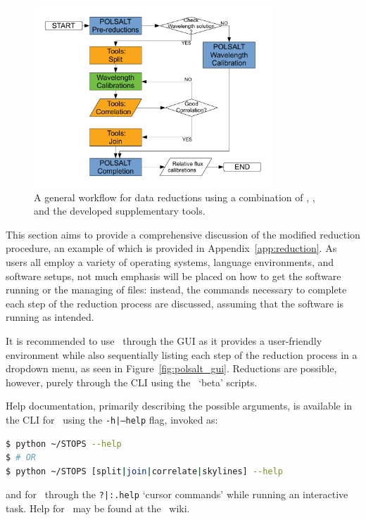 \begin{figure}[t]
    \centering
    \includegraphics[width = 0.8\textwidth]{figures/3_new_workflow.pdf}
    \caption{A general workflow for data reductions using a combination of \polsalt, \iraf, and the developed supplementary tools.}
    \label{fig:new_workflow}
\end{figure}

This section aims to provide a comprehensive discussion of the modified reduction procedure, an example of which is provided in Appendix~\ref{app:reduction}. As users all employ a variety of operating systems, language environments, and software setups, not much emphasis will be placed on how to get the software running or the managing of files: instead, the commands necessary to complete each step of the reduction process are discussed, assuming that the software is running as intended.

It is recommended to use \polsalt\ through the \gls{GUI} as it provides a user-friendly environment while also sequentially listing each step of the reduction process in a dropdown menu, as seen in Figure~\ref{fig:polsalt_gui}. Reductions are possible, however, purely through the \gls{CLI} using the \polsalt\ `beta' scripts.

Help documentation, primarily describing the possible arguments, is available in the \gls{CLI} for \stops\ using the \texttt{-h|--help} flag, invoked as:
\begin{lstlisting}[language=bash]
$ python ~/STOPS --help
$ # OR
$ python ~/STOPS [split|join|correlate|skylines] --help
\end{lstlisting}
{\parskip=0pt
and for \iraf\ through the \texttt{?|:.help} `cursor commands' while running an interactive task. Help for \polsalt\ may be found at the \polsalt\ wiki.}

